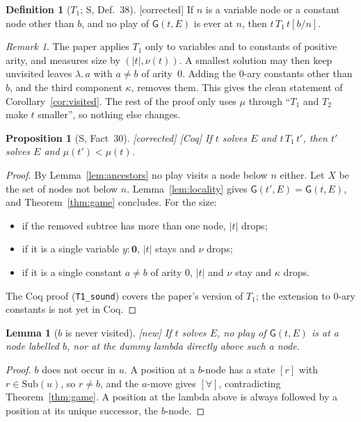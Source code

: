 \documentclass[11pt]{article}
\newcommand{\Ground}{\mathbf{0}}
\newcommand{\Sub}{\mathrm{Sub}}
\newcommand{\Gm}{\mathsf{G}}
\newcommand{\Fixed}{\textsf{[corrected]}}
\newcommand{\New}{\textsf{[new]}}
\newcommand{\Coq}{\textsf{[Coq]}}
\theoremstyle{plain}
\newtheorem{proposition}[theorem]{Proposition}
\newtheorem{lemma}[theorem]{Lemma}
\theoremstyle{definition}
\newtheorem{definition}[theorem]{Definition}
\theoremstyle{remark}
\newtheorem{remark}[theorem]{Remark}
\begin{document}
\begin{definition}[$T_1$; S, Def.~38]\label{def:T1}
\Fixed{} If $n$ is a variable node or a constant node other than $b$,
and no play of $\Gm(t,E)$ is ever at $n$, then $t\,T_1\,t[b/n]$.
\end{definition}

\begin{remark}
The paper applies $T_1$ only to variables and to constants of positive
arity, and measures size by $(|t|,\nu(t))$.  A smallest solution may
then keep unvisited leaves $\lambda.\,a$ with $a\ne b$ of arity~$0$.
Adding the 0-ary constants other than $b$, and the third component
$\kappa$, removes them.  This gives the clean statement of
Corollary~\ref{cor:visited}.  The rest of the proof only uses $\mu$
through ``$T_1$ and $T_2$ make $t$ smaller'', so nothing else changes.
\end{remark}

\begin{proposition}[S, Fact~30]\label{prop:T1}
\Fixed{} \Coq{} If $t$ solves $E$ and $t\,T_1\,t'$, then $t'$ solves $E$
and $\mu(t')<\mu(t)$.
\end{proposition}
\begin{proof}
By Lemma~\ref{lem:ancestors} no play visits a node below $n$ either.
Let $X$ be the set of nodes not below $n$.  Lemma~\ref{lem:locality}
gives $\Gm(t',E)=\Gm(t,E)$, and Theorem~\ref{thm:game} concludes.  For
the size:
\begin{itemize}
\item if the removed subtree has more than one node, $|t|$ drops;
\item if it is a single variable $y:\Ground$, $|t|$ stays and $\nu$
  drops;
\item if it is a single constant $a\ne b$ of arity $0$, $|t|$ and $\nu$
  stay and $\kappa$ drops.
\end{itemize}
The Coq proof (\texttt{T1\_sound}) covers the paper's version of $T_1$;
the extension to 0-ary constants is not yet in Coq.
\end{proof}

\begin{lemma}[$b$ is never visited]\label{lem:bnotvisited}
\New{} If $t$ solves $E$, no play of $\Gm(t,E)$ is at a node labelled
$b$, nor at the dummy lambda directly above such a node.
\end{lemma}
\begin{proof}
$b$ does not occur in $u$.  A position at a $b$-node has a state $[r]$
with $r\in\Sub(u)$, so $r\ne b$, and the $a$-move gives $[\forall]$,
contradicting Theorem~\ref{thm:game}.  A position at the lambda above
is always followed by a position at its unique successor, the $b$-node.
\end{proof}
\end{document}
